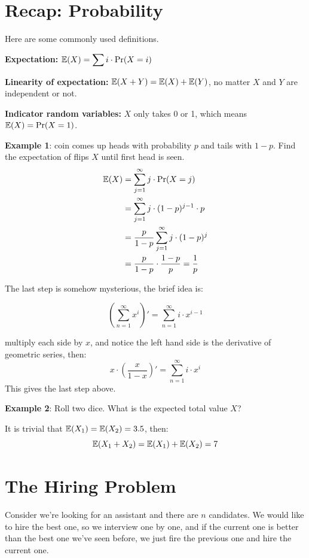
\begin{spacing}{1.3}
    
    \section{Recap: Probability}

    Here are some commonly used definitions.

    {\bf Expectation: } $\displaystyle \mathbb{E}(X)=\sum i\cdot \Pr(X=i)$

    {\bf Linearity of expectation: } $\mathbb{E}(X+Y)=\mathbb{E}(X)+\mathbb{E}(Y)$, 
    no matter $X$ and $Y$ are independent or not.

    {\bf Indicator random variables:} $X$ only takes 
    0 or 1, which means $\mathbb{E}(X)=\Pr(X=1)$.

    {\bf Example 1}: coin comes up heads with probability $p$ and 
    tails with $1-p$. Find the expectation of flips $X$ 
    until first head is seen.
    \begin{align*}
        \mathbb{E}(X)&=\sum_{j=1}^{\infty} j\cdot \Pr(X=j)\\
        &= \sum_{j=1}^{\infty}j\cdot (1-p)^{j-1}\cdot p\\
        &= \frac{p}{1-p} \sum_{j=1}^{\infty}j\cdot (1-p)^{j}\\
        &= \frac{p}{1-p}\cdot \frac{1-p}{p} =\frac{1}{p}
    \end{align*}

    The last step is somehow mysterious, the brief idea is: 

    $$\left(\sum_{n=1}^{\infty} x^i\right)'=\sum_{n=1}^{\infty}i\cdot x^{i-1}$$

    multiply each side by $x$, and notice the left hand side is the 
    derivative of geometric series, then: 
    $$x\cdot \left(\frac{x}{1-x}\right)'=\sum_{n=1}^{\infty}i\cdot x^{i}$$
    This gives the last step above.

    {\bf Example 2}: Roll two dice. What is the expected total value $X$?

    It is trivial that $\mathbb{E}(X_1)=\mathbb{E}(X_2)=3.5$, then: 
    $$\mathbb{E}(X_1+X_2)=\mathbb{E}(X_1)+\mathbb{E}(X_2)=7$$

    \section{The Hiring Problem}

    Consider we're looking for an assistant and there are $n$ 
    candidates. We would like to hire the best one, so we 
    interview one by one, and if the current one is better than 
    the best one we've seen before, we just fire the previous one 
    and hire the current one.


\end{spacing}
